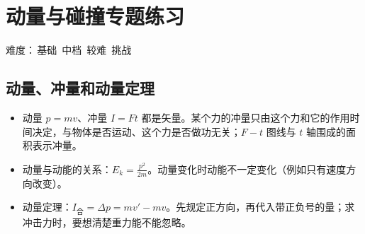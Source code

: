 \documentclass[\gkver]{gaokaozhenti}
\begin{document}
\chapter{动量与碰撞专题练习}

\begin{center}
\small 难度：\textcolor{orange!85!black}{}\,基础\qquad
\textcolor{orange!85!black}{}\,中档\qquad
\textcolor{orange!85!black}{}\,较难\qquad
\textcolor{orange!85!black}{}\,挑战
\end{center}

\section{动量、冲量和动量定理}
\begin{yaodian}
\begin{itemize}
\item 动量 $p=mv$、冲量 $I=Ft$ 都是矢量。某个力的冲量只由这个力和它的作用时间决定，与物体是否运动、这个力是否做功无关；$F-t$ 图线与 $t$ 轴围成的面积表示冲量。
\item 动量与动能的关系：$E_{k}=\frac{p^{2}}{2m}$。动量变化时动能不一定变化（例如只有速度方向改变）。
\item 动量定理：$I_{\text{合}}=\Delta p=mv'-mv$。先规定正方向，再代入带正负号的量；求冲击力时，要想清楚重力能不能忽略。
\end{itemize}
\end{yaodian}
\end{document}
